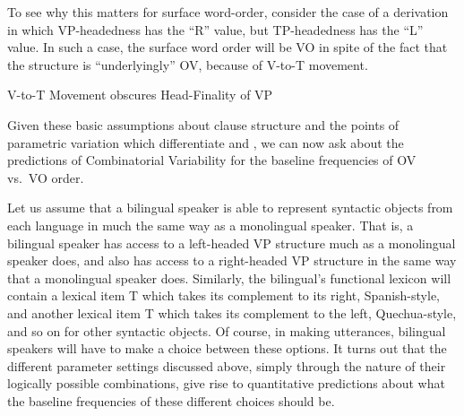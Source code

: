 \documentclass[output=paper]{langsci/langscibook}
\begin{document}
To see why this matters for surface word-order, consider the case of a
derivation in which VP-headedness has the  \enquote{R} value, but TP-headedness
has the  \enquote{L} value.  In such a case, the surface word order will be VO
in spite of the fact that the structure is “underlyingly” OV, because of V-to-T
movement.

\ea {}V-to-T Movement obscures Head-Finality of VP\\
\z

Given these basic assumptions about clause structure and the points of
parametric variation which differentiate  and , we can now ask
about the predictions of Combinatorial Variability for the baseline frequencies
of OV vs.\ VO order.

Let us assume that a bilingual speaker is able to represent syntactic objects
from each language in much the same way as a monolingual speaker.  That is, a
bilingual speaker has access to a left-headed VP structure much as a
monolingual  speaker does, and also has access to a right-headed VP
structure in the same way that a monolingual  speaker does.  Similarly,
the bilingual’s functional lexicon will contain a lexical item T which takes
its complement to its right, Spanish-style, and another lexical item T which
takes its complement to the left, Quechua-style, and so on for other syntactic
objects.  Of course, in making utterances, bilingual speakers will have to make
a choice between these options.  It turns out that the different parameter
settings discussed above, simply through the nature of their logically possible
combinations, give rise to quantitative predictions about what the baseline
frequencies of these different choices should be.
\end{document}
